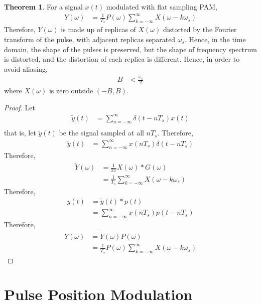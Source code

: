\documentclass[titlepage, fleqn, a4paper, 12pt, twoside]{article}
\theoremstyle{definition}
\theoremstyle{theorem}
\newtheorem{theorem}{Theorem}
\renewcommand{\tilde}{\widetilde}
\begin{document}
\begin{theorem}
	For a signal $x(t)$ modulated with flat sampling PAM,
	\begin{align*}
		Y(\omega) &= \frac{1}{T_s} P(\omega) \sum\limits_{k = -\infty}^{\infty} X(\omega - k \omega_s)
	\end{align*}
	Therefore, $Y(\omega)$ is made up of replicas of $X(\omega)$ distorted by the Fourier transform of the pulse, with adjacent replicas separated $\omega_s$.
	Hence, in the time domain, the shape of the pulses is preserved, but the shape of frequency spectrum is distorted, and the distortion of each replica is different.
	Hence, in order to avoid aliasing,
	\begin{align*}
		B &< \frac{\omega_s}{2}
	\end{align*}
	where $X(\omega)$ is zero outside $(-B,B)$.
	\label{thm:Fourier_transform_of_signal_modulated_by_direct_multiplication_PAM}
\end{theorem}

\begin{proof}
	Let
	\begin{align*}
		\tilde{y}(t) &= \sum\limits_{n = -\infty}^{\infty} \delta(t - n T_s) x(t)\\
	\end{align*}
	that is, let $\tilde{y}(t)$ be the signal sampled at all $n T_s$.
	Therefore,
	\begin{align*}
		\tilde{y}(t) &= \sum\limits_{n = -\infty}^{\infty} x(n T_s) \delta(t - n T_s)
	\end{align*}
	Therefore,
	\begin{align*}
		\tilde{Y}(\omega) &= \frac{1}{2 \pi} X(\omega) \ast G(\omega)\\
		&= \frac{1}{T_s} \sum\limits_{k = -\infty}^{\infty} X(\omega - k \omega_s)
	\end{align*}
	Therefore,
	\begin{align*}
		y(t) &= \tilde{y}(t) \ast p(t)\\
		&= \sum\limits_{n = -\infty}^{\infty} x(n T_s) p(t - n T_s)
	\end{align*}
	Therefore,
	\begin{align*}
		Y(\omega) &= \tilde{Y}(\omega) P(\omega)\\
		&= \frac{1}{T_s} P(\omega) \sum\limits_{k = -\infty}^{\infty} X(\omega - k \omega_s)
	\end{align*}
\end{proof}

\clearpage
\part{Pulse Position Modulation}
\end{document}
